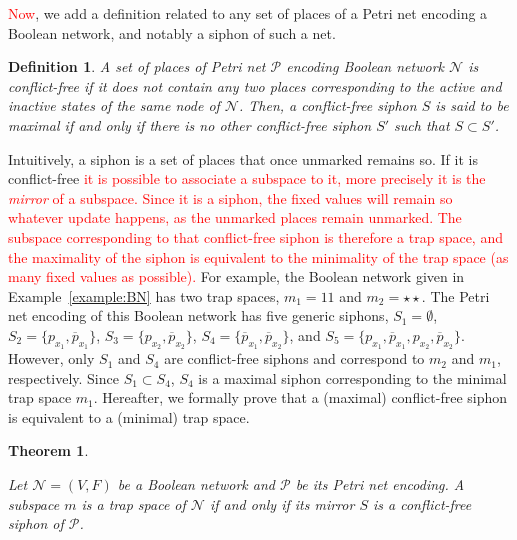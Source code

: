 \documentclass[preprint,12pt]{elsarticle}
\newtheorem{theorem}{Theorem}[section]
\newtheorem{definition}{Definition}[section]
\newcommand{\change}[1]{\textcolor{red}{#1}}
\begin{document}
\change{Now}, we add a definition related to any set of places of a Petri net encoding a Boolean network, and notably a siphon of such a net.

\begin{definition}

  A set of places of Petri net \(\mathcal{P}\) encoding Boolean network \(\mathcal{N}\) is \emph{conflict-free} if it does not contain any two places corresponding to the active and inactive states of the same \emph{node} of \(\mathcal{N}\).
  Then, a conflict-free siphon \(S\) is said to be \emph{maximal} if and only if there is no other conflict-free siphon \(S'\) such that \(S \subset S'\).

\end{definition}

Intuitively, a siphon is a set of places that once unmarked remains so.
If it is conflict-free \change{it is possible to associate a subspace to it, more precisely it is the \emph{mirror} of a subspace.
Since it is a siphon, the fixed values will remain so whatever update happens, as the unmarked places remain unmarked.
The subspace corresponding to that conflict-free siphon is therefore a trap space, and the maximality of the siphon is equivalent to the minimality of the trap space (as many fixed values as possible).}
For example, the Boolean network given in Example~\ref{example:BN} has two trap spaces, \(m_1 = 11\) and \(m_2 = \star\star\).
The Petri net encoding of this Boolean network has five generic siphons, \(S_1 = \emptyset\), \(S_2 = \{p_{x_1}, \overline{p}_{x_1}\}\), \(S_3 = \{p_{x_2}, \overline{p}_{x_2}\}\), \(S_4 = \{\overline{p}_{x_1}, \overline{p}_{x_2}\}\), and \(S_5 = \{p_{x_1}, \overline{p}_{x_1}, p_{x_2}, \overline{p}_{x_2}\}\).
However, only \(S_1\) and \(S_4\) are conflict-free siphons and correspond to \(m_2\) and \(m_1\), respectively.
Since \(S_1 \subset S_4\), \(S_4\) is a maximal siphon corresponding to the minimal trap space \(m_1\).
Hereafter, we formally prove that a (maximal) conflict-free siphon is equivalent to a (minimal) trap space.

\begin{theorem}%
\label{theo:ts_2_sp}

  Let \(\mathcal{N} = (V, F)\) be a Boolean network and \(\mathcal{P}\) be its Petri net encoding. A subspace \(m\) is a trap space of \(\mathcal{N}\) if and only if its mirror \(S\) is a conflict-free siphon of \(\mathcal{P}\).

\end{theorem}
\end{document}
